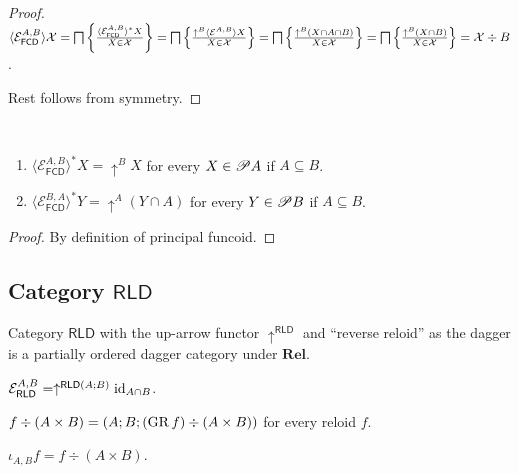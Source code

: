 \begin{proof}
  $\langle \mathcal{E}_{\mathsf{FCD}}^{A,B} \rangle \mathcal{X} =
  \bigsqcap \left\{ \frac{ \langle \mathcal{E}_{\mathsf{FCD}}^{A,B}
  \rangle^{\ast} X }{ X \in \mathcal{X} }\right\} =
  \bigsqcap \left\{ \frac{ \uparrow^B  \langle \mathcal{E}^{A,B} \rangle X
  }{ X \in \mathcal{X} }\right\} = \bigsqcap \left\{ \frac{
  \uparrow^B  (X \cap A \cap B) }{ X \in \mathcal{X}
  }\right\} = \bigsqcap \left\{ \frac{ \uparrow^B  (X \cap B) }{
  X \in \mathcal{X} }\right\} = \mathcal{X} \div B$.
  
  Rest follows from symmetry.
\end{proof}

\begin{prop}
  ~
  \begin{enumerate}
    \item $\langle \mathcal{E}_{\mathsf{FCD}}^{A,B} \rangle^{\ast} X
    = \uparrow^B X$ for every $X \in \mathscr{P} A$ if $A \subseteq B$.
    
    \item $\langle \mathcal{E}_{\mathsf{FCD}}^{B,A} \rangle^{\ast}
    Y = \uparrow^A (Y \cap A)$ for every $Y \in \mathscr{P} B$ if $A \subseteq
    B$.
  \end{enumerate}
\end{prop}

\begin{proof}
  By definition of principal funcoid.
\end{proof}

\subsection{\texorpdfstring{Category $\mathsf{RLD}$}{Category RLD}}

Category $\mathsf{RLD}$ with the up-arrow functor
$\uparrow^{\mathsf{RLD}}$ and ``reverse reloid'' as the dagger is a
partially ordered dagger category under $\mathbf{Rel}$.

\begin{obvious}
$\mathcal{E}_{\mathsf{RLD}}^{A,B} = \uparrow^{\mathsf{RLD} (A ;
B)} \operatorname{id}_{A \cap B}$.
\end{obvious}

\begin{defn}
  $f \div (A \times B) = (A ; B ; (\operatorname{GR} f) \div (A \times B))$ for every
  reloid $f$.
\end{defn}

\begin{prop}
  $\iota_{A, B} f = f \div (A \times B)$.
\end{prop}


